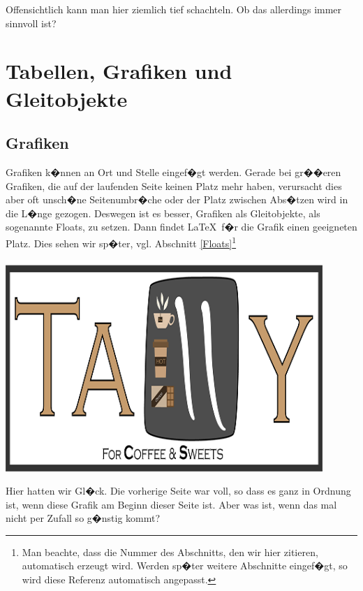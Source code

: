 \documentclass[11pt,a4paper]{article} %
\begin{document}
Offensichtlich kann man hier ziemlich tief schachteln. Ob das allerdings immer sinnvoll ist?



\section{Tabellen, Grafiken und Gleitobjekte}
\label{TabellenGrafikenFloats}


\subsection{Grafiken}
\label{Grafiken}

Grafiken k�nnen an Ort und Stelle eingef�gt werden. Gerade bei gr��eren Grafiken, die auf der laufenden Seite keinen Platz mehr haben, verursacht dies aber oft unsch�ne Seitenumbr�che oder der Platz zwischen Abs�tzen wird in die L�nge gezogen. Deswegen ist es besser, Grafiken als Gleitobjekte, als sogenannte \glqq Floats\grqq, zu setzen. Dann findet \LaTeX\ f�r die Grafik einen geeigneten Platz. Dies sehen wir sp�ter, vgl. Abschnitt \ref{Floats}\footnote{Man beachte, dass die Nummer des Abschnitts, den wir hier zitieren, automatisch erzeugt wird. Werden sp�ter weitere Abschnitte eingef�gt, so wird diese Referenz automatisch angepasst.}

\begin{center}
\includegraphics[width=12cm]{TallyLogo.png}
\end{center}

Hier hatten wir Gl�ck. Die vorherige Seite war voll, so dass es ganz in Ordnung ist, wenn diese Grafik am Beginn dieser Seite ist. Aber was ist, wenn das mal nicht per Zufall so g�nstig kommt?
\end{document}
